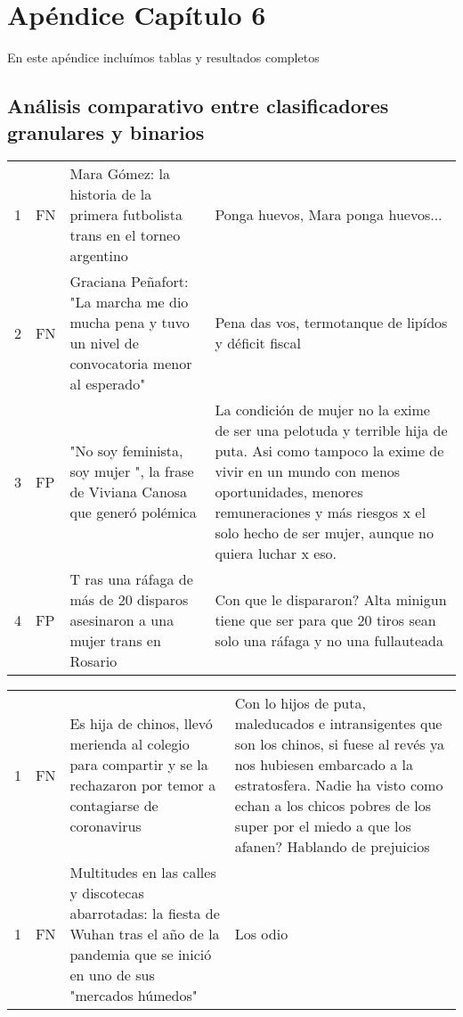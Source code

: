\chapter{Apéndice Capítulo 6}
\label{app:06}

En este apéndice incluímos tablas y resultados completos


\section{Análisis comparativo entre clasificadores granulares y binarios}


\begin{table}[ht!]
    \centering
    \footnotesize
    \begin{tabular}{p{} p{} p{} p{}}
        \hline
        1 & FN & Mara Gómez: la historia de la primera futbolista trans en el torneo argentino & Ponga huevos, Mara ponga huevos... \\
        2 & FN & Graciana Peñafort: "La marcha me dio mucha pena y tuvo un nivel de convocatoria menor al esperado" & Pena das vos, termotanque de lipídos y déficit fiscal \\
        3 & FP & "No soy feminista, soy mujer ", la frase de Viviana Canosa que generó polémica & La condición de mujer no la exime de ser una pelotuda y terrible hija de puta. Asi como tampoco la exime de vivir en un mundo con menos oportunidades, menores remuneraciones y más riesgos x el solo hecho de ser mujer, aunque no quiera luchar x eso. \\
        4 & FP & T ras una ráfaga de más de 20 disparos asesinaron a una mujer trans en Rosario & Con que le dispararon? Alta minigun tiene que ser para que 20 tiros sean solo una ráfaga y no una fullauteada \\
    \end{tabular}
    \begin{tabular}{p{} p{} p{} p{}}
        1 & FN & Es hija de chinos, llevó merienda al colegio para compartir y se la rechazaron por temor a contagiarse de coronavirus &  Con lo hijos de puta, maleducados e intransigentes que son los chinos, si fuese al revés ya nos hubiesen embarcado a la estratosfera. Nadie ha visto como echan a los chicos pobres de los super por el miedo a que los afanen? Hablando de prejuicios \\
        1 & FN & Multitudes en las calles y discotecas abarrotadas: la fiesta de Wuhan tras el año de la pandemia que se inició en uno de sus "mercados húmedos" &  Los odio \\

\end{tabular}
\end{table}
